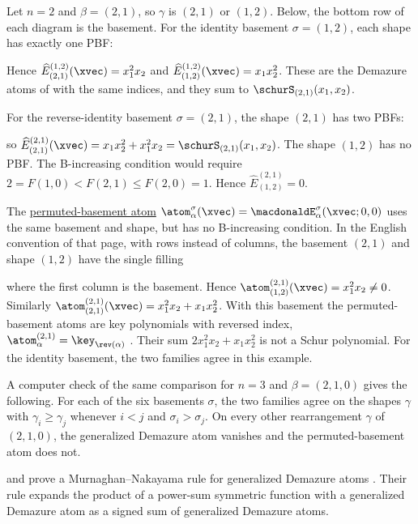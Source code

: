 \begin{example}
Let $n=2$ and $\beta=(2,1)$, so $\gamma$ is $(2,1)$ or $(1,2)$.
Below, the bottom row of each diagram is the basement.
For the identity basement $\sigma=(1,2)$, each shape has exactly one PBF:
\begin{figure}
\end{figure}
Hence $\widehat{E}^{(1,2)}_{(2,1)}(\xvec)=x_1^2x_2$ and
$\widehat{E}^{(1,2)}_{(1,2)}(\xvec)=x_1x_2^2$.  These are the Demazure atoms
of \cite{Mason2009} with the same indices, and they sum to
$\schurS_{(2,1)}(x_1,x_2)$.

For the reverse-identity basement $\sigma=(2,1)$, the shape $(2,1)$ has two
PBFs:
\begin{figure}
\end{figure}
so $\widehat{E}^{(2,1)}_{(2,1)}(\xvec)=x_1x_2^2+x_1^2x_2=\schurS_{(2,1)}(x_1,x_2)$.
The shape $(1,2)$ has no PBF.  The B-increasing condition would require
$2=F(1,0)<F(2,1)\leq F(2,0)=1$.  Hence $\widehat{E}^{(2,1)}_{(1,2)}=0$.

The \hyperref[permutedBasementAtom]{permuted-basement atom}
$\atom^{\sigma}_\alpha(\xvec)=\macdonaldE^{\sigma}_\alpha(\xvec;0,0)$
uses the same basement and shape, but has no B-increasing condition.
In the English convention of that page, with rows instead of columns, the
basement $(2,1)$ and shape $(1,2)$ have the single filling
\begin{figure}
\end{figure}
where the first column is the basement.  Hence
$\atom^{(2,1)}_{(1,2)}(\xvec)=x_1^2x_2\neq 0$.  Similarly
$\atom^{(2,1)}_{(2,1)}(\xvec)=x_1^2x_2+x_1x_2^2$.
With this basement the permuted-basement atoms are key polynomials with
reversed index, $\atom^{(2,1)}_\alpha=\key_{\rev(\alpha)}$
\cite[Sect.~3.1]{Alexandersson2015gbMacdonald}.  Their sum
$2x_1^2x_2+x_1x_2^2$ is not a Schur polynomial.
For the identity basement, the two families agree in this example.
\end{example}

A computer check of the same comparison for $n=3$ and $\beta=(2,1,0)$ gives
the following.
For each of the six basements $\sigma$, the two families agree on the
shapes $\gamma$ with $\gamma_i\geq\gamma_j$ whenever $i<j$ and
$\sigma_i>\sigma_j$.  On every other rearrangement $\gamma$ of $(2,1,0)$, the
generalized Demazure atom vanishes and the permuted-basement atom does not.

 and  prove a
Murnaghan--Nakayama rule for generalized Demazure atoms
\cite{RemmelTiefenbruck2013}.  Their rule expands the product of a
power-sum symmetric function with a generalized Demazure atom as a signed
sum of generalized Demazure atoms.
